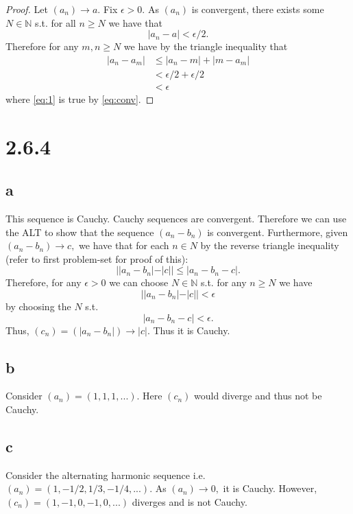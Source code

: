 \documentclass[10pt]{article}
\begin{document}
\begin{proof}
    Let $(a_n)\to a.$
    Fix $\epsilon>0.$ As $(a_n)$ is convergent, there exists some $N\in\mathbb{N}$ s.t. for all $n\ge N$ we have that
    \begin{equation}\label{eq:conv}
        |a_n-a|<\epsilon/2.
    \end{equation}
    Therefore for any $m,n\ge N$ we have by the triangle inequality that
    \begin{align}
        |a_n-a_m|&\le|a_n-m| + |m-a_m|\nonumber\\
        &<\epsilon/2 +\epsilon/2\label{eq:1}\\
        &<\epsilon\nonumber
    \end{align}
    where \eqref{eq:1} is true by \eqref{eq:conv}.
\end{proof}


\section*{2.6.4}

\subsection*{a}


This sequence is Cauchy. Cauchy sequences are convergent. Therefore we can use the ALT to show that the sequence $(a_n-b_n)$ is convergent. Furthermore,  given $(a_n-b_n) \to c,$ we  have that for each $n\in N$ by the reverse triangle inequality (refer to first problem-set for proof of this):
\begin{equation*}
    ||a_n-b_n| - |c|| \le |a_n-b_n - c|.
\end{equation*}
Therefore, for any $\epsilon > 0$ we can choose $N\in\mathbb{N}$ s.t. for any $n\ge N$ we have
\[||a_n-b_n| - |c|| <\epsilon\]
by choosing the $N$ s.t.
\[|a_n-b_n - c|<\epsilon.\]
Thus, $(c_n)=(|a_n-b_n|)\to|c|.$ Thus it is Cauchy.
\subsection*{b}
Consider $(a_n)=(1,1,1,...).$ Here $(c_n)$ would diverge and thus not be Cauchy.

\subsection*{c}

Consider the alternating harmonic sequence i.e. $(a_n) = (1, -1/2, 1/3, -1/4, ...).$ As $(a_n)\to 0,$ it is Cauchy. However, $(c_n)= (1, -1, 0, -1, 0, ...)$ diverges and is not Cauchy.
\end{document}
